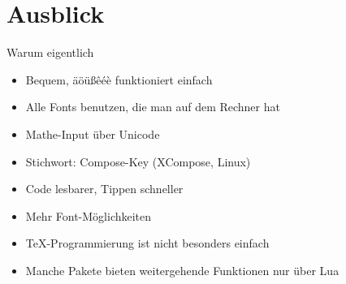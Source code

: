 \section{Ausblick}

\begin{frame}
  \centering
\end{frame}

\begin{frame}[fragile]{Warum eigentlich \LuaTeX}
  \linespread{1.5}
  \begin{description}
    \item[Unicode-Input]
      \begin{itemize}
        \item Bequem, äöüßêéè funktioniert einfach
      \end{itemize}
    \item[OTF-Fonts]
      \begin{itemize}
        \item Alle Fonts benutzen, die man auf dem Rechner hat
      \end{itemize}
    \item[Unicode-Math]
      \begin{itemize}
        \item Mathe-Input über Unicode
        \item Stichwort: Compose-Key (XCompose, Linux)
        \item Code lesbarer, Tippen schneller
        \item Mehr Font-Möglichkeiten
      \end{itemize}
    \item[Lua-Programmierung]
      \begin{itemize}
        \item \TeX-Programmierung ist nicht besonders einfach
        \item Manche Pakete bieten weitergehende Funktionen nur über Lua
      \end{itemize}
  \end{description}
\end{frame}

